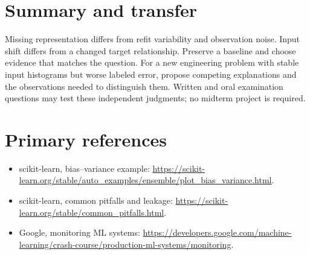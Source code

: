 \section{Summary and transfer}
Missing representation differs from refit variability and observation noise. Input shift differs from a changed target relationship. Preserve a baseline and choose evidence that matches the question. For a new engineering problem with stable input histograms but worse labeled error, propose competing explanations and the observations needed to distinguish them. Written and oral examination questions may test these independent judgments; no midterm project is required.

\section{Primary references}
\begin{itemize}
\item scikit-learn, bias--variance example: \url{https://scikit-learn.org/stable/auto_examples/ensemble/plot_bias_variance.html}.
\item scikit-learn, common pitfalls and leakage: \url{https://scikit-learn.org/stable/common_pitfalls.html}.
\item Google, monitoring ML systems: \url{https://developers.google.com/machine-learning/crash-course/production-ml-systems/monitoring}.
\end{itemize}
